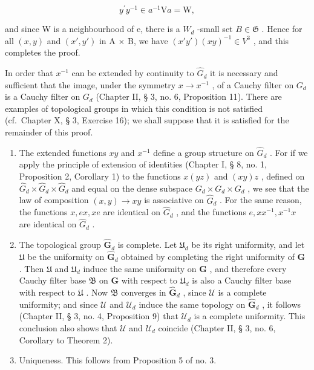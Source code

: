 \[
y ^ {\prime} y ^ {- 1} \in a ^ {- 1} \mathrm{V}a = \mathrm{W},
\]

and since W is a neighbourhood of e, there is a \(W_{d}\) -small set \(B \in \mathfrak{G}\) . Hence for all \((x, y)\) and \((x', y')\) in A × B, we have \((x'y')(xy)^{-1} \in V^{3}\) , and this completes the proof.

In order that \(x^{-1}\) can be extended by continuity to \(\hat{G}_d\) it is necessary and sufficient that the image, under the symmetry \(x \to x^{-1}\) , of a Cauchy filter on \(G_d\) is a Cauchy filter on \(G_d\) (Chapter II, § 3, no. 6, Proposition 11). There are examples of topological groups in which this condition is not satisfied (cf.~Chapter X, § 3, Exercise 16); we shall suppose that it is satisfied for the remainder of this proof.

\begin{enumerate}
\def\labelenumi{\arabic{enumi})}
\setcounter{enumi}{1}
\item
  The extended functions \(xy\) and \(x^{-1}\) define a group structure on \(\hat{G}_d\) . For if we apply the principle of extension of identities (Chapter I, § 8, no. 1, Proposition 2, Corollary 1) to the functions \(x(yz)\) and \((xy)z\) , defined on \(\hat{G}_d \times \hat{G}_d \times \hat{G}_d\) and equal on the dense subspace \(G_d \times G_d \times G_d\) , we see that the law of composition \((x, y) \to xy\) is associative on \(\hat{G}_d\) . For the same reason, the functions \(x, ex, xe\) are identical on \(\hat{G}_d\) , and the functions \(e, xx^{-1}, x^{-1}x\) are identical on \(\hat{G}_d\) .
\item
  The topological group \(\hat{\mathbf{G}}_d\) is complete. Let \(\mathfrak{U}_d\) be its right uniformity, and let \(\mathfrak{U}\) be the uniformity on \(\hat{\mathbf{G}}_d\) obtained by completing the right uniformity of \(\mathbf{G}\) . Then \(\mathfrak{U}\) and \(\mathfrak{U}_d\) induce the same uniformity on \(\mathbf{G}\) , and therefore every Cauchy filter base \(\mathfrak{B}\) on \(\mathbf{G}\) with respect to \(\mathfrak{U}_d\) is also a Cauchy filter base with respect to \(\mathfrak{U}\) . Now \(\mathfrak{B}\) converges in \(\hat{\mathbf{G}}_d\) , since \(\mathcal{U}\) is a complete uniformity; and since \(\mathcal{U}\) and \(\mathcal{U}_d\) induce the same topology on \(\hat{\mathbf{G}}_d\) , it follows (Chapter II, § 3, no. 4, Proposition 9) that \(\mathcal{U}_d\) is a complete uniformity. This conclusion also shows that \(\mathcal{U}\) and \(\mathcal{U}_d\) coincide (Chapter II, § 3, no. 6, Corollary to Theorem 2).
\item
  Uniqueness. This follows from Proposition 5 of no. 3.
\end{enumerate}

